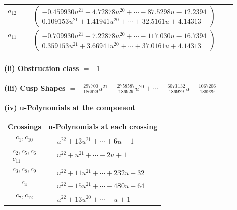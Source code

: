 \documentclass[1p]{elsarticle_modified}
\theoremstyle{definition}
\begin{document}
\begin{tabular}{m{7pt} m{180pt} m{7pt} m{180pt} }
\flushright $a_{12}=$&$\begin{pmatrix}-0.459930 u^{21}-4.72878 u^{20}+\cdots-87.5298 u-12.2394\\0.109153 u^{21}+1.41941 u^{20}+\cdots+32.5161 u+4.14313\end{pmatrix}$ \\
\flushright $a_{11}=$&$\begin{pmatrix}-0.709930 u^{21}-7.22878 u^{20}+\cdots-117.030 u-16.7394\\0.359153 u^{21}+3.66941 u^{20}+\cdots+37.0161 u+4.14313\end{pmatrix}$\\&\end{tabular}
\flushleft \textbf{(ii) Obstruction class $= -1$}\\~\\
\flushleft \textbf{(iii) Cusp Shapes $= -\frac{297700}{186929} u^{21}-\frac{2758587}{186929} u^{20}+\cdots-\frac{6073132}{186929} u-\frac{1067206}{186929}$}\\~\\
\newpage\renewcommand{\arraystretch}{1}
\flushleft \textbf{(iv) u-Polynomials at the component}\newline \\
\begin{tabular}{m{50pt}|m{274pt}}
Crossings & \hspace{64pt}u-Polynomials at each crossing \\
\hline $$\begin{aligned}c_{1},c_{10}\end{aligned}$$&$\begin{aligned}
&u^{22}+13 u^{21}+\cdots+6 u+1
\end{aligned}$\\
\hline $$\begin{aligned}c_{2},c_{5},c_{6}\\c_{11}\end{aligned}$$&$\begin{aligned}
&u^{22}+u^{21}+\cdots-2 u+1
\end{aligned}$\\
\hline $$\begin{aligned}c_{3},c_{8},c_{9}\end{aligned}$$&$\begin{aligned}
&u^{22}+11 u^{21}+\cdots+232 u+32
\end{aligned}$\\
\hline $$\begin{aligned}c_{4}\end{aligned}$$&$\begin{aligned}
&u^{22}-15 u^{21}+\cdots-480 u+64
\end{aligned}$\\
\hline $$\begin{aligned}c_{7},c_{12}\end{aligned}$$&$\begin{aligned}
&u^{22}+13 u^{20}+\cdots- u+1
\end{aligned}$\\
\hline
\end{tabular}\\~\\
\end{document}
